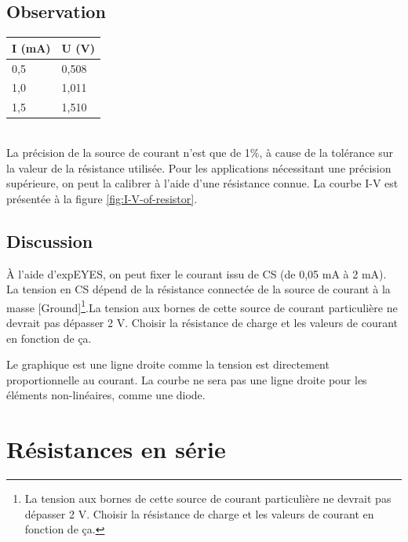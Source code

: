 \documentclass{book}
\begin{document}
\subsection{Observation}


\begin{tabular}{|l|l|}
\hline
\textbf{I (mA)}&\textbf{U (V)}
\\ \hline
0,5&0,508
\\ \hline
1,0&1,011
\\ \hline
1,5&1,510
\\ \hline
\end{tabular}\\[0.5em]






La précision de la source de courant n'est que de 1\%{}, à cause de la tolérance sur la valeur de la résistance utilisée. Pour les applications nécessitant une précision supérieure, on peut la calibrer à l'aide d'une résistance connue. La courbe I-V est présentée à la figure  \ref{fig:I-V-of-resistor}.

\subsection{Discussion}


À l'aide d'expEYES, on peut fixer le courant issu de CS (de 0,05 mA à 2 mA). La tension en CS dépend de la résistance connectée de la source de courant à la masse [Ground]\footnote{La tension aux bornes de cette source de courant particulière ne devrait pas dépasser 2 V. Choisir la résistance de charge et les valeurs de courant en fonction de ça.}.La tension aux bornes de cette source de courant particulière ne devrait pas dépasser 2 V. Choisir la résistance de charge et les valeurs de courant en fonction de ça.



Le graphique est une ligne droite comme la tension est directement proportionnelle au courant. La courbe ne sera pas une ligne droite pour les éléments non-linéaires, comme une diode.










\section{Résistances en série}
\end{document}
